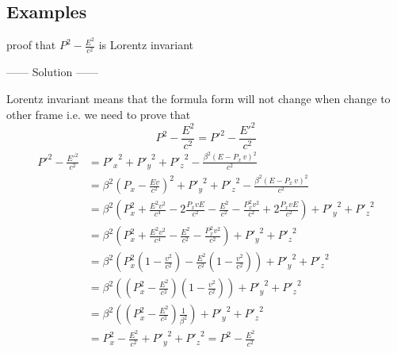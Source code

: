 \documentclass{article}
\begin{document}
\subsection{Examples}
\begin{example}
proof that $P^2 - \frac{E^2}{c^2}$ is Lorentz invariant
\begin{center}
    ------ \textcolor{Solution}{Solution} ------
\end{center}
Lorentz invariant means that the formula form will not change when change to other frame i.e. we need to prove that 
\[
    P^2 - \frac{E^2}{c^2} = {P'}^2 - \frac{{E'}^2}{c^2}
\]
\begin{align*}
    {P'}^2 - \frac{{E'}^2}{c^2} &={P'_x}^2 + {P'_y}^2 + {P'_z}^2 - \frac{\beta^2{\left(E - P_x\, v\right)}^2}{c^2}\\
                                &=\beta^2{\left(P_x - \frac{Ev}{c^2}\right)}^2 + {P'_y}^2 + {P'_z}^2 - \frac{\beta^2{\left(E - P_x\, v\right)}^2}{c^2}\\
                                &=\beta^2\left(P_x^2 + \frac{E^2v^2}{c^4} - 2\frac{P_x v E }{c^2} - \frac{E^2}{c^2} - \frac{P_x^2 v^2}{c^2} + 2\frac{P_x v E}{c^2}\right) + {P'_y}^2 + {P'_z}^2\\
                                &=\beta^2\left(P_x^2 + \frac{E^2v^2}{c^4} - \frac{E^2}{c^2} - \frac{P_x^2 v^2}{c^2}\right) + {P'_y}^2 + {P'_z}^2\\
                                &=\beta^2\left(P_x^2\left(1 - \frac{v^2}{c^2}\right)-\frac{E^2}{c^2}\left(1 - \frac{v^2}{c^2}\right)\right) + {P'_y}^2 + {P'_z}^2\\
                                &=\beta^2\left(\left(P_x^2 - \frac{E^2}{c^2} \right)\left(1 - \frac{v^2}{c^2}\right)\right) + {P'_y}^2 + {P'_z}^2\\
                                &=\beta^2\left(\left(P_x^2 - \frac{E^2}{c^2}\right)\frac{1}{\beta^2}\right) + {P'_y}^2 + {P'_z}^2\\
                                &=P_x^2 - \frac{E^2}{c^2} + {P'_y}^2 + {P'_z}^2 = P^2 - \frac{E^2}{c^2}
\end{align*}
\end{example}
\end{document}
